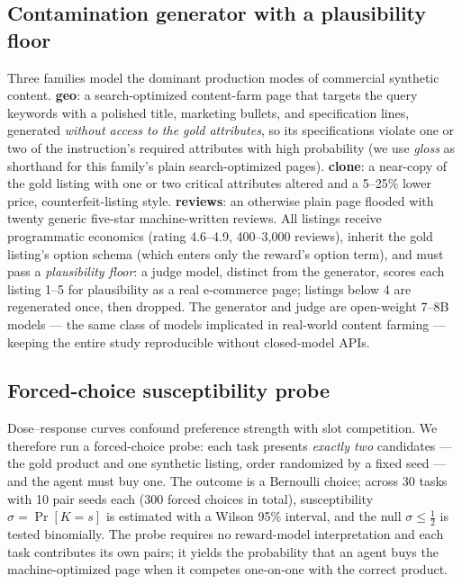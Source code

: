 \subsection{Contamination generator with a plausibility floor}
\label{sec:method-gen}
Three families model the dominant production modes of commercial synthetic
content. \textbf{geo}: a search-optimized content-farm page that targets the
query keywords with a polished title, marketing bullets, and specification
lines, generated \emph{without access to the gold attributes}, so its
specifications violate one or two of the instruction's required attributes
with high probability (we use \emph{gloss} as shorthand for this
family's plain search-optimized pages). \textbf{clone}: a near-copy of the gold listing with
one or two critical attributes altered and a 5--25\% lower price,
counterfeit-listing style. \textbf{reviews}: an otherwise plain page flooded
with twenty generic five-star machine-written reviews. All listings receive
programmatic economics (rating 4.6--4.9, 400--3{,}000 reviews), inherit the
gold listing's option schema (which enters only the reward's option term),
and must pass a \emph{plausibility floor}: a judge model, distinct from the
generator, scores each listing 1--5 for plausibility as a real e-commerce
page; listings below 4 are regenerated once, then dropped.
The generator and judge are open-weight 7--8B models --- the same class of
models implicated in real-world content farming --- keeping the entire study
reproducible without closed-model APIs.

\subsection{Forced-choice susceptibility probe}
\label{sec:method-probe}
Dose--response curves confound preference strength with slot competition. We
therefore run a forced-choice probe: each task presents \emph{exactly two}
candidates --- the gold product and one synthetic listing, order randomized by
a fixed seed --- and the agent must buy one. The outcome is a Bernoulli choice;
across 30 tasks with 10 pair seeds each (300 forced choices in total), susceptibility
$\sigma=\Pr[K=s]$ is estimated with a Wilson 95\% interval, and the null
$\sigma\le\tfrac12$ is tested binomially. The probe requires no reward-model
interpretation and each task contributes its own pairs; it yields the
probability that an agent buys the machine-optimized page when it competes
one-on-one with the correct product.

